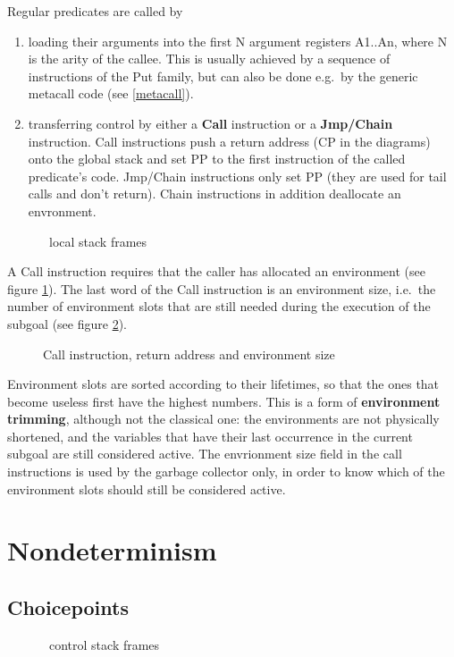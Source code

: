 Regular predicates are called by
\begin{enumerate}
\item loading their arguments into the
first N argument registers A1..An, where N is the arity of the callee.
This is usually achieved by a sequence of instructions of the Put family,
but can also be done e.g.\ by the generic metacall code (see \ref{metacall}).
\item transferring control by either a {\bf Call} instruction or
a {\bf Jmp/Chain} instruction. Call instructions push a return address
(CP in the diagrams) onto the global stack and set PP to the first
instruction of the called predicate's code.
Jmp/Chain instructions only set PP (they are used for tail calls and
don't return). Chain instructions in addition deallocate an envronment.
\end{enumerate}
\begin{figure}
\label{localframes}
\caption{\eclipse\ local stack frames}
\end{figure}
A Call instruction requires that the caller has allocated an
environment (see figure \ref{localframes}).
The last word of the Call instruction is an environment
size, i.e.\ the number of environment slots that are still needed
during the execution of the subgoal (see figure \ref{callinstr}). 
\begin{figure}
\label{callinstr}
\caption{Call instruction, return address and environment size}
\end{figure}
Environment slots are sorted according to their lifetimes, so that the
ones that become useless first have the highest numbers.  This is a
 form of {\bf environment trimming}, although not the
classical one:  the environments are not physically shortened, and the
variables that have their last occurrence in the current subgoal are
still considered active.
The envrionment size field in the call instructions is used by the
garbage collector only, in order to know which of the environment
slots should still be considered active.




\section{Nondeterminism}

\subsection{Choicepoints}
\begin{figure}
\caption{\eclipse\ control stack frames}
\end{figure}

